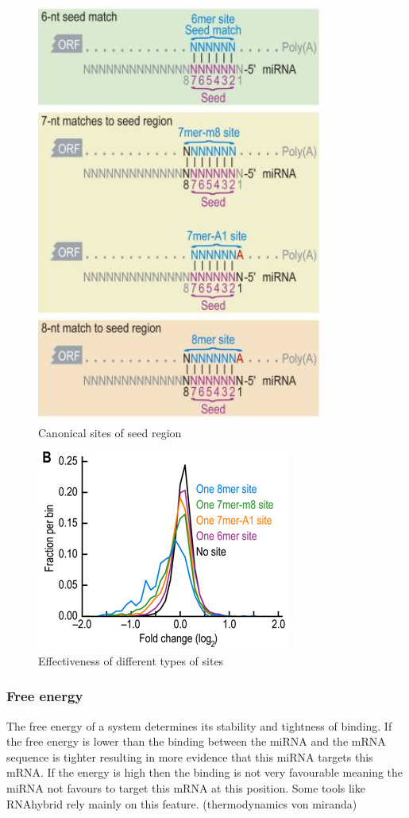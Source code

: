 \documentclass[12pt]{article}
\begin{document}
\begin{figure}
\centering
\includegraphics[scale=0.6]{results/canonical_sites.png}
\caption{Canonical sites of seed region}
\label{Fig:canonical}
\end{figure}


\begin{figure}
\centering
\includegraphics[scale=0.6]{results/site_3addi.png}
\caption{Effectiveness of different types of sites}
\label{types}
\end{figure}

\subsubsection{Free energy}
The free energy of a system determines its stability and tightness of binding. If the free energy is lower than the binding between the miRNA and the mRNA sequence is tighter resulting in more evidence that this miRNA targets this mRNA. If the energy is high then the binding is not very favourable meaning the miRNA not favours to target this mRNA at this position. Some tools like RNAhybrid \cite{Rehmsmeier} rely mainly on this feature. (thermodynamics von miranda)
 
\end{document}
